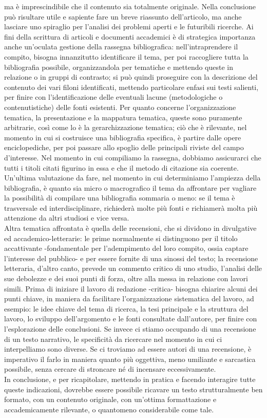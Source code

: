 \documentclass{article}
\begin{document}
ma è imprescindibile che il contenuto sia totalmente originale. Nella conclusione può risultare utile e sapiente fare un breve riassunto dell'articolo,
ma anche lasciare uno spiraglio per l'analisi dei problemi aperti e le futuribili ricerche. 
Ai fini della scrittura di articoli e documenti accademici è di strategica importanza anche un'oculata gestione della rassegna bibliografica:
nell'intraprendere il compito, bisogna innanzitutto identificare il tema, per poi raccogliere tutta la bibliografia possibile, 
organizzandola per tematiche e mettendo queste in relazione o in gruppi di contrasto; si può quindi proseguire con la descrizione del contenuto dei vari filoni 
identificati, mettendo particolare enfasi sui testi salienti, per finire con l'identificazione delle eventuali lacune (metodologiche o contenutistiche)
delle fonti esistenti. Per quanto concerne l'organizzazione tematica, la presentazione e la mappatura tematica, queste sono puramente arbitrarie, 
così come lo è la gerarchizzazione tematica; ciò che è rilevante, nel momento in cui si costruisce una bibliografia specifica, è partire dalle opere enciclopediche, 
per poi passare allo spoglio delle principali riviste del campo d'interesse. Nel momento in cui compiliamo la rassegna,
dobbiamo assicurarci che tutti i titoli citati figurino in essa e che il metodo di citazione sia coerente. Un'ultima valutazione da fare,
nel momento in cui determiniamo l'ampiezza della bibliografia, è quanto sia micro o macrografico il tema da affrontare per vagliare la possibilità di compilare una 
bibliografia sommaria o meno: se il tema è trasversale ed interdisciplinare, richiederà molte più fonti e richiamerà molta più attenzione da altri studiosi e vice 
versa. \\Altra tematica affrontata è quella delle recensioni, che si dividono in divulgative ed accademico-letterarie: le prime normalmente si distinguono per il 
titolo accattivante -fondamentale per l'adempimento del loro compito, ossia captare l'interesse del pubblico- e per essere fornite di una sinossi del testo; 
la recensione letteraria, d'altro canto, prevede un commento critico di uno studio, l'analisi delle sue debolezze e dei suoi punti di forza, 
oltre alla messa in relazione con lavori simili. Prima di iniziare il lavoro di redazione -critica- bisogna chiarire alcuni dei punti chiave, 
in maniera da facilitare l'organizzazione sistematica del lavoro, ad esempio: le idee chiave del tema di ricerca, la tesi principale e la struttura del lavoro,
lo sviluppo dell'argomento e le fonti consultate dall'autore, per finire con l'esplorazione delle conclusioni. Se invece ci stiamo occupando di una recensione di un 
testo narrativo, le specificità da ricercare nel momento in cui ci interpelliamo sono diverse. Se ci troviamo ad essere autori di una recensione, 
è imperativo il farlo in maniera quanto più oggettiva, meno umiliante e sarcastica possibile, senza cercare di stroncare né di incensare eccessivamente. \\ 
In conclusione, e per ricapitolare, mettendo in pratica e facendo interagire tutte queste indicazioni, dovrebbe essere possibile ricavare un testo strutturalmente 
ben formato, con un contenuto originale, con un'ottima formattazione e accademicamente rilevante, o quantomeno considerabile come tale. 
\end{document}
